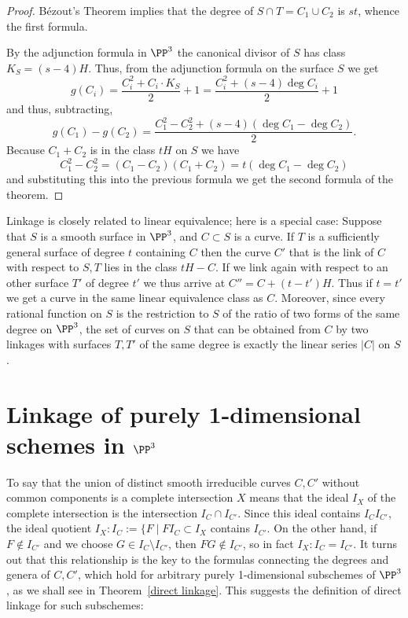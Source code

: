 \begin{proof}
B\'ezout's Theorem implies that the degree of $S\cap T = C_1\cup C_2$ is $st$, whence the first formula.

By the adjunction formula in $\PP^3$ the canonical divisor of $S$ has class $K_S = (s-4)H$. Thus, from the 
adjunction formula on the surface $S$ we get
$$
g(C_i) = \frac{C_i^2+C_i\cdot K_S}{2}+1 = \frac{C_i^2+(s-4) \deg C_i}{2}+1
$$
and thus, subtracting,
$$
g(C_1)-g(C_2) = \frac{C_1^2-C_2^2+(s-4) (\deg C_1-\deg C_2)} {2}.
$$
Because $C_1+C_2$ is in the class $tH$ on $S$ we have
$$
C_1^2-C_2^2 = (C_1-C_2)(C_1+C_2) = t(\deg C_1-\deg C_2)
$$
and substituting this into the previous formula we get the second formula of the theorem.
\end{proof}

\begin{remark}
Linkage is closely related to linear equivalence; here is a special case:
Suppose that $S$ is a smooth surface in $\PP^3$, and $C\subset S$ is a curve. If $T$ is a sufficiently general surface of degree $t$
containing $C$ then the curve $C'$ that is the link of $C$ with respect to $S,T$ lies in the class $tH-C$. If we link again with
respect to an other surface $T'$ of degree $t'$ we thus arrive at $C'' = C+(t-t')H$. Thus if $t=t'$ we get a curve in the same 
linear equivalence class as $C$. Moreover, since every rational function on $S$ is the restriction to $S$ of the ratio of two forms of the same degree on $\PP^3$,
the set of curves on $S$ that can be obtained from $C$ by two linkages with surfaces $T, T'$ of the same degree is exactly the 
linear series $|C|$ on $S$.
\end{remark}

\section{Linkage of purely 1-dimensional schemes in $\PP^3$}
To say that the union of distinct smooth irreducible curves $C, C'$ without common components is a complete intersection $X$ means that 
the ideal $I_X$ of the complete intersection is the intersection $I_C\cap I_{C'}$. Since this ideal contains $I_CI_{C'}$, the ideal quotient
$I_X:I_C:= \{F \mid FI_C\subset I_X$
contains $I_{C'}$. On the other hand, if $F \notin I_{C'}$ and we choose $G\in I_C\setminus I_{C'}$, then $FG\notin I_{C'}$, so in fact
$I_X:I_C = I_{C'}$. It turns out that this relationship is the key to the formulas connecting the degrees and genera of $C,C'$, which hold 
for arbitrary purely 1-dimensional subschemes of $\PP^3$, as we shall see in Theorem~\ref{direct linkage}. This suggests the definition
of direct linkage for such subschemes:

